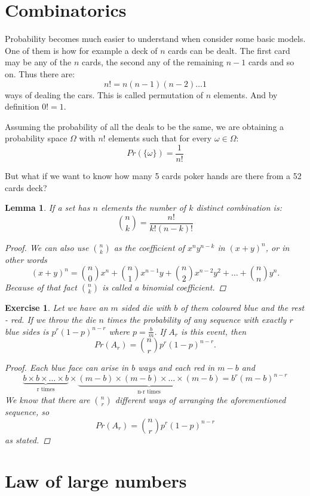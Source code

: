 \documentclass[12pt, a4paper,leqno]{report}
\newtheorem{lemma}{Lemma}
\newtheorem{exercise}{Exercise}
\begin{document}
\section{Combinatorics}
Probability becomes much easier to understand when consider some basic models.
One of them is how for example a deck of $n$ cards can be dealt. The first card may be any of the $n$ cards, the second any of the remaining $n - 1$ cards and so on. Thus there are:
\[ n! = n(n - 1)(n - 2)\dots 1 \]
ways of dealing the cars. This is called permutation of $n$ elements. And by definition $0! = 1$.

Assuming the probability of all the deals to be the same, we are obtaining a probability space $\Omega$ with $n!$ elements such that for every $\omega\in\Omega$:
\[ Pr(\lbrace\omega\rbrace) = \frac{1}{n!} \]

But what if we want to know how many 5 cards poker hands are there from a 52 cards deck?

\begin{lemma}
	If a set has $n$ elements the number of $k$ distinct combination is:
	\[ \binom{n}{k} = \frac{n!}{k!(n-k)!} \]
	\begin{proof}
		We can also use $\binom{n}{k}$ as the coefficient of $x^ny^{n-k}$ in $(x+y)^n$, or in other words
		\[ (x+y)^n = \binom{n}{0}x^n + \binom{n}{1}x^{n-1}y + \binom{n}{2}x^{n-2}y^2 +\dots + \binom{n}{n}y^n. \]
		Because of that fact $\binom{n}{k}$ is called a \textit{binomial coefficient}.
	\end{proof}
\end{lemma}

\begin{exercise}
	 Let we have an $m$ sided die with $b$ of them coloured blue and the rest - red. If we throw the die $n$ times the probability of any sequence with exactly $r$ blue sides is $p^r(1-p)^{n-r}$ where $p = \frac{b}{m}$.
	 If $A_r$ is this event, then
	 \[ Pr(A_r) = \binom{n}{r}p^r(1-p)^{n-r}. \]
	 \begin{proof}
	 	Each blue face can arise in $b$ ways and each red in $m-b$ and
	 	\[ \underbrace{b\times b\times\dots\times b}_{\mbox{r times}}\times \underbrace{(m-b)\times (m-b)\times\dots\times (m-b)}_{\mbox{n-r times}} = b^r(m-b)^{n-r} \]
	 	We know that there are $\binom{n}{r}$ different ways of arranging the aforementioned sequence, so
	 	\[ Pr(A_r) = \binom{n}{r}p^r(1-p)^{n-r} \]
	 	as stated.
	 \end{proof}
\end{exercise}

\section{Law of large numbers}
\end{document}
